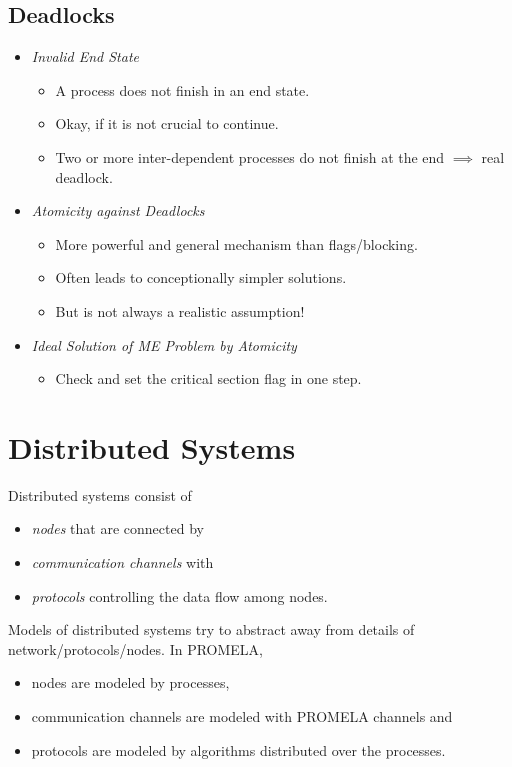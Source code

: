 		\subsection{Deadlocks}
			\begin{itemize}
				\item \textit{Invalid End State}
					\begin{itemize}
						\item A process does not finish in an end state.
						\item Okay, if it is not crucial to continue.
						\item Two or more inter-dependent processes do not finish at the end \(\implies\) real deadlock.
					\end{itemize}
				\item \textit{Atomicity against Deadlocks}
					\begin{itemize}
						\item More powerful and general mechanism than flags/blocking.
						\item Often leads to conceptionally simpler solutions.
						\item But is not always a realistic assumption!
					\end{itemize}
				\item \textit{Ideal Solution of ME Problem by Atomicity}
					\begin{itemize}
						\item Check and set the critical section flag in one  step.
					\end{itemize}
			\end{itemize}

	\section{Distributed Systems}
		\label{sec:distributed}


		Distributed systems consist of
		\begin{itemize}
			\item \textit{nodes} that are connected by
			\item \textit{communication channels} with
			\item \textit{protocols} controlling the data flow among nodes.
		\end{itemize}
		Models of distributed systems try to abstract away from details of network/protocols/nodes. In PROMELA,
		\begin{itemize}
			\item nodes are modeled by processes,
			\item communication channels are modeled with PROMELA channels and
			\item protocols are modeled by algorithms distributed over the processes.
		\end{itemize}

